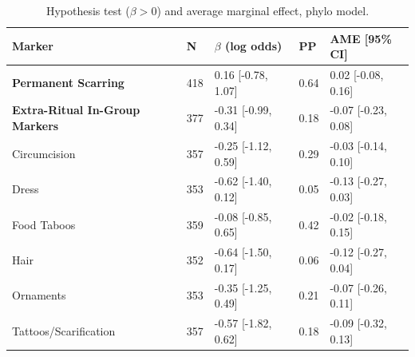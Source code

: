 \begin{table}[!ht]
\centering
\small
\caption{Hypothesis test ($\beta > 0$) and average marginal effect, phylo model.}
\label{tab:intonly_hypothesis_ame_phylo}
\begin{tabular}{lllll}
\toprule
Marker & N & $\beta$ (log odds) & PP & AME [95\% CI] \\
\midrule
\textbf{Permanent Scarring} & 418 & 0.16 [-0.78, 1.07] & 0.64 & 0.02 [-0.08, 0.16] \\
\textbf{Extra-Ritual In-Group Markers} & 377 & -0.31 [-0.99, 0.34] & 0.18 & -0.07 [-0.23, 0.08] \\
\midrule
Circumcision & 357 & -0.25 [-1.12, 0.59] & 0.29 & -0.03 [-0.14, 0.10] \\
Dress & 353 & -0.62 [-1.40, 0.12] & 0.05 & -0.13 [-0.27, 0.03] \\
Food Taboos & 359 & -0.08 [-0.85, 0.65] & 0.42 & -0.02 [-0.18, 0.15] \\
Hair & 352 & -0.64 [-1.50, 0.17] & 0.06 & -0.12 [-0.27, 0.04] \\
Ornaments & 353 & -0.35 [-1.25, 0.49] & 0.21 & -0.07 [-0.26, 0.11] \\
Tattoos/Scarification & 357 & -0.57 [-1.82, 0.62] & 0.18 & -0.09 [-0.32, 0.13] \\
\bottomrule
\end{tabular}
\end{table}